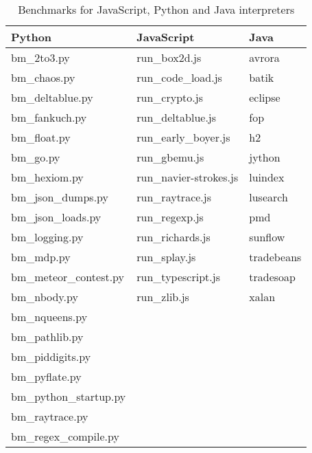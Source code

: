 \documentclass[parskip=full, paper=a4, fontsize=12pt]{scrartcl} %
\numberwithin{equation}{section}
\numberwithin{figure}{section}
\numberwithin{table}{section}
\begin{document}
\begin{table}
\centering
    \begin{tabular}{|l|l|l|}
        \hline
        \textbf{Python}         &\textbf{JavaScript}        &\textbf{Java} \\
        \hline
        bm\_2to3.py             &run\_box2d.js              &avrora     \\
        bm\_chaos.py            &run\_code\_load.js         &batik      \\
        bm\_deltablue.py        &run\_crypto.js             &eclipse    \\
        bm\_fankuch.py          &run\_deltablue.js          &fop        \\
        bm\_float.py            &run\_early\_boyer.js       &h2         \\
        bm\_go.py               &run\_gbemu.js              &jython     \\
        bm\_hexiom.py           &run\_navier-strokes.js     &luindex    \\
        bm\_json\_dumps.py      &run\_raytrace.js           &lusearch   \\
        bm\_json\_loads.py      &run\_regexp.js             &pmd        \\
        bm\_logging.py          &run\_richards.js           &sunflow    \\
        bm\_mdp.py              &run\_splay.js              &tradebeans \\
        bm\_meteor\_contest.py  &run\_typescript.js         &tradesoap  \\
        bm\_nbody.py            &run\_zlib.js               &xalan      \\
        bm\_nqueens.py          &                           &           \\
        bm\_pathlib.py          &                           &           \\
        bm\_piddigits.py        &                           &           \\
        bm\_pyflate.py          &                           &           \\
        bm\_python\_startup.py  &                           &           \\
        bm\_raytrace.py         &                           &           \\
        bm\_regex\_compile.py   &                           &           \\
        \hline
    \end{tabular}
    \caption{Benchmarks for JavaScript, Python and Java interpreters}
    \label{tab:benchmarks}
\end{table}
\end{document}
